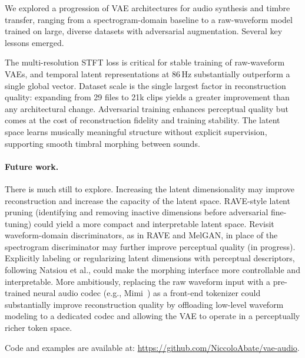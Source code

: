\documentclass[10pt, twocolumn]{article}
\begin{document}
We explored a progression of VAE architectures for audio synthesis and timbre transfer,
ranging from a spectrogram-domain baseline to a raw-waveform model trained on large,
diverse datasets with adversarial augmentation. Several key lessons emerged.

The multi-resolution STFT loss is critical for stable training of raw-waveform VAEs,
and temporal latent representations at 86\,Hz substantially outperform a single global vector.
Dataset scale is the single largest factor in reconstruction quality:
expanding from 29 files to 21k clips yields a greater improvement than any architectural change.
Adversarial training enhances perceptual quality but comes at the cost of
reconstruction fidelity and training stability.
The latent space learns musically meaningful structure without explicit supervision,
supporting smooth timbral morphing between sounds.

\paragraph{Future work.}
There is much still to explore. Increasing the latent dimensionality may improve
reconstruction and increase the capacity of the latent space.
RAVE-style latent pruning (identifying and removing inactive dimensions
before adversarial fine-tuning) could yield a more compact and interpretable latent space.
Revisit waveform-domain discriminators, as in RAVE and MelGAN,
in place of the spectrogram discriminator may further improve perceptual quality (in progress).
Explicitly labeling or regularizing latent dimensions with perceptual descriptors,
following Natsiou et al., could make the morphing interface more controllable and interpretable.
More ambitiously, replacing the raw waveform input with a pre-trained neural audio codec
(e.g., Mimi~\cite{defossez2024moshi}) as a front-end tokenizer could
substantially improve reconstruction quality by offloading low-level waveform modeling
to a dedicated codec and allowing the VAE to operate in a perceptually richer token space.

Code and examples are available at: \url{https://github.com/NiccoloAbate/vae-audio}.

\clearpage


\end{document}

